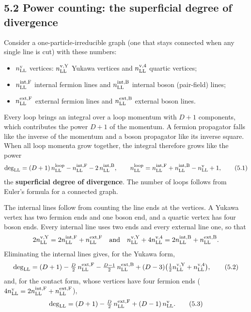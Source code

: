 \documentclass[
  10pt,
]{article}
\providecommand{\tightlist}{%
  \setlength{\itemsep}{0pt}\setlength{\parskip}{0pt}}
\begin{document}
\hypertarget{power-counting-the-superficial-degree-of-divergence}{%
\subsection{5.2 Power counting: the superficial degree of
divergence}\label{power-counting-the-superficial-degree-of-divergence}}

Consider a one-particle-irreducible graph (one that stays connected when
any single line is cut) with these numbers:

\begin{itemize}
\tightlist
\item
  \(n^{\rm v}_{\rm LL}\) vertices: \(n^{\rm v,Y}_{\rm LL}\) Yukawa
  vertices and \(n^{\rm v,4}_{\rm LL}\) quartic vertices;
\item
  \(n^{\rm int,F}_{\rm LL}\) internal fermion lines and
  \(n^{\rm int,B}_{\rm LL}\) internal boson (pair-field) lines;
\item
  \(n^{\rm ext,F}_{\rm LL}\) external fermion lines and
  \(n^{\rm ext,B}_{\rm LL}\) external boson lines.
\end{itemize}

Every loop brings an integral over a loop momentum with \(D+1\)
components, which contributes the power \(D+1\) of the momentum. A
fermion propagator falls like the inverse of the momentum and a boson
propagator like its inverse square. When all loop momenta grow together,
the integral therefore grows like the power
\[\deg_{\rm LL}=(D+1)\,n^{\rm loop}_{\rm LL}-n^{\rm int,F}_{\rm LL}-2\,n^{\rm int,B}_{\rm LL},\qquad n^{\rm loop}_{\rm LL}=n^{\rm int,F}_{\rm LL}+n^{\rm int,B}_{\rm LL}-n^{\rm v}_{\rm LL}+1 , \tag{5.1}\]
the \textbf{superficial degree of divergence}. The number of loops
follows from Euler's formula for a connected graph.

The internal lines follow from counting the line ends at the vertices. A
Yukawa vertex has two fermion ends and one boson end, and a quartic
vertex has four boson ends. Every internal line uses two ends and every
external line one, so that
\[2n^{\rm v,Y}_{\rm LL}=2n^{\rm int,F}_{\rm LL}+n^{\rm ext,F}_{\rm LL}\quad\text{and}\quad n^{\rm v,Y}_{\rm LL}+4n^{\rm v,4}_{\rm LL}=2n^{\rm int,B}_{\rm LL}+n^{\rm ext,B}_{\rm LL}.\]
Eliminating the internal lines gives, for the Yukawa form,
\[\deg_{\rm LL}=(D+1)-\tfrac D2\,n^{\rm ext,F}_{\rm LL}-\tfrac{D-1}2\,n^{\rm ext,B}_{\rm LL}+(D-3)\big(\tfrac12n^{\rm v,Y}_{\rm LL}+n^{\rm v,4}_{\rm LL}\big), \tag{5.2}\]
and, for the contact form, whose vertices have four fermion ends
(\(4n^{\rm v}_{\rm LL}=2n^{\rm int,F}_{\rm LL}+n^{\rm ext,F}_{\rm LL}\)),
\[\deg_{\rm LL}=(D+1)-\tfrac D2\,n^{\rm ext,F}_{\rm LL}+(D-1)\,n^{\rm v}_{\rm LL}. \tag{5.3}\]
\end{document}
